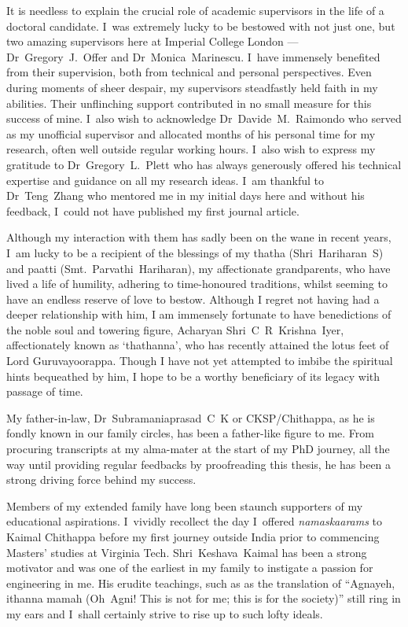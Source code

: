 It is needless to explain the crucial role of academic supervisors in the life
of a doctoral candidate. I~was extremely lucky to be bestowed with not just one,
but two amazing supervisors here at Imperial College London --- \mbox{Dr Gregory
J.\ Offer} and \mbox{Dr Monica Marinescu}. I~have immensely benefited from their
supervision, both from technical and personal perspectives. Even during moments
of sheer despair, my supervisors steadfastly held faith in my abilities. Their
unflinching support contributed in no small measure for this success of mine.
I~also wish to acknowledge \mbox{Dr Davide M.\ Raimondo} who served as my
unofficial supervisor and allocated months of his personal time for my research,
often well outside regular working hours. I~also wish to express my gratitude to
\mbox{Dr Gregory L.\ Plett} who has always generously offered his technical
expertise and guidance on all my research ideas. I~am thankful to \mbox{Dr Teng
Zhang} who mentored me in my initial days here and without his feedback, I~could
not have published my first journal article.

Although my interaction with them has sadly been on the wane in recent years,
I~am lucky to be a recipient of the blessings of my thatha \mbox{(Shri~Hariharan
S)} and paatti \mbox{(Smt.\ Parvathi Hariharan)}, my affectionate grandparents,
who have lived a life of humility, adhering to time-honoured traditions, whilst
seeming to have an endless reserve of love to bestow. Although I regret not
having had a deeper relationship with him, I am immensely fortunate  to have
benedictions of the noble soul and towering figure, Acharyan \mbox{Shri C R
Krishna Iyer}, affectionately known as `thathanna', who has recently attained
the lotus feet of Lord Guruvayoorappa. Though I have not yet attempted to imbibe
the spiritual hints bequeathed by him, I hope to be a worthy beneficiary of its
legacy with passage of time.

My father-in-law, \mbox{Dr Subramaniaprasad C K} or CKSP/Chithappa, as he is
fondly known in our family circles, has been a father-like figure to me. From
procuring transcripts at my alma-mater at the start of my PhD journey, all the
way until providing regular feedbacks by proofreading this thesis, he has been a
strong driving force behind my success.

Members of my extended family have long been staunch supporters of my
educational aspirations. I~vividly recollect the day I~offered
\emph{namaskaarams} to Kaimal Chithappa before my first journey outside India
prior to commencing Masters' studies at Virginia Tech. \mbox{Shri~Keshava
Kaimal} has been a strong motivator and was one of the earliest in my family to
instigate a passion for engineering in me. His erudite teachings, such as as the
translation of  \enquote{Agnayeh, ithanna mamah (Oh~Agni! This is not for me;
this is for the society)} still ring in my ears and I~shall certainly strive to
rise up to such lofty ideals.


